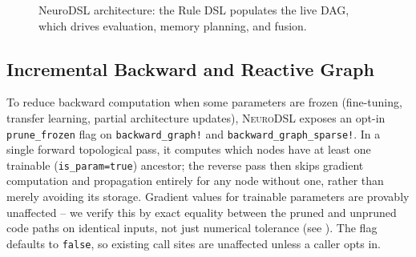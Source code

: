 \documentclass{article}
\begin{document}
\begin{figure}[H]
\centering
{}
\caption{NeuroDSL architecture: the Rule DSL populates the live DAG, which drives evaluation, memory planning, and fusion.}
\label{fig:architecture}
\end{figure}

\subsection{Incremental Backward and Reactive Graph}
\label{sec:incremental_backward}

To reduce backward computation when some parameters are frozen (fine-tuning, transfer learning, partial architecture updates), \textsc{NeuroDSL} exposes an opt-in \texttt{prune\_frozen} flag on \texttt{backward\_graph!} and \texttt{backward\_graph\_sparse!}. In a single forward topological pass, it computes which nodes have at least one trainable (\texttt{is\_param=true}) ancestor; the reverse pass then skips gradient computation and propagation entirely for any node without one, rather than merely avoiding its storage. Gradient values for trainable parameters are provably unaffected -- we verify this by exact equality between the pruned and unpruned code paths on identical inputs, not just numerical tolerance (see ). The flag defaults to \texttt{false}, so existing call sites are unaffected unless a caller opts in.
\end{document}
